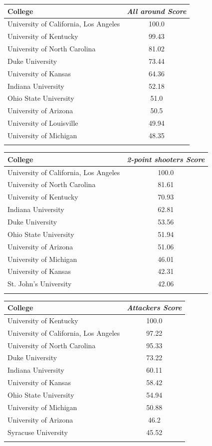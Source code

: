 \documentclass[10pt,a4paper,twocolumn]{article}
\begin{document}
\begin{table}[t]
	\begin{tabular}{lc}
		College & \textit{All around Score}  \\
		\hline
		University of California, Los Angeles & 100.0\\
		University of Kentucky & 99.43\\
		University of North Carolina & 81.02\\
		Duke University & 73.44\\
		University of Kansas & 64.36\\
		Indiana University & 52.18\\
		Ohio State University & 51.0\\
		University of Arizona & 50.5\\
		University of Louisville & 49.94\\
		University of Michigan & 48.35\\
		&\\
		
	\end{tabular}
	
	\begin{tabular}{lc}
		College & \textit{2-point shooters Score}  \\
		\hline
		University of California, Los Angeles & 100.0\\
		University of North Carolina & 81.61\\
		University of Kentucky & 70.93\\
		Indiana University & 62.81\\
		Duke University & 53.56\\
		Ohio State University & 51.94\\
		University of Arizona & 51.06\\
		University of Michigan & 46.01\\
		University of Kansas & 42.31\\
		St. John's University & 42.06\\
		&\\
		
	\end{tabular}
	
	\begin{tabular}{lc}
		College & \textit{Attackers Score}  \\
		\hline
		University of Kentucky & 100.0\\
		University of California, Los Angeles & 97.22\\
		University of North Carolina & 95.33\\
		Duke University & 73.22\\
		Indiana University & 60.11\\
		University of Kansas & 58.42\\
		Ohio State University & 54.94\\
		University of Michigan & 50.88\\
		University of Arizona & 46.2\\
		Syracuse University & 45.52\\
		&\\
		

\end{tabular}
\end{table}
\end{document}
